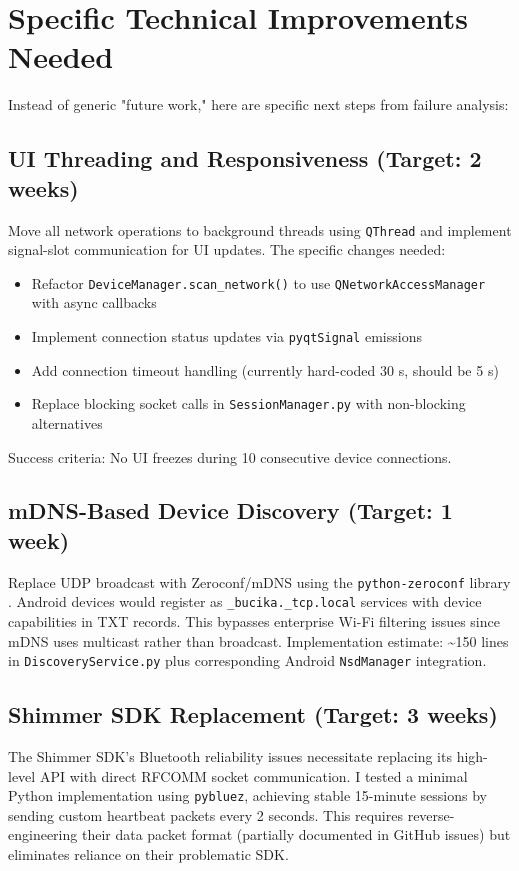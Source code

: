 \section{Specific Technical Improvements Needed}

Instead of generic "future work," here are specific next steps from failure analysis:

\subsection{UI Threading and Responsiveness (Target: 2 weeks)}
Move all network operations to background threads using \texttt{QThread} and implement signal-slot communication for UI updates. The specific changes needed:
\begin{itemize}
    \item Refactor \texttt{DeviceManager.scan\_network()} to use \texttt{QNetworkAccessManager} with async callbacks
    \item Implement connection status updates via \texttt{pyqtSignal} emissions
    \item Add connection timeout handling (currently hard-coded 30 s, should be 5 s)
    \item Replace blocking socket calls in \texttt{SessionManager.py} with non-blocking alternatives
\end{itemize}
Success criteria: No UI freezes during 10 consecutive device connections.

\subsection{mDNS-Based Device Discovery (Target: 1 week)}
Replace UDP broadcast with Zeroconf/mDNS using the \texttt{python-zeroconf} library \cite{ref19}. Android devices would register as \texttt{\_bucika.\_tcp.local} services with device capabilities in TXT records. This bypasses enterprise Wi-Fi filtering issues since mDNS uses multicast rather than broadcast. Implementation estimate: \textasciitilde{}150 lines in \texttt{DiscoveryService.py} plus corresponding Android \texttt{NsdManager} integration.
\subsection{Shimmer SDK Replacement (Target: 3 weeks)}
The Shimmer SDK's Bluetooth reliability issues necessitate replacing its high-level API with direct RFCOMM socket communication. I tested a minimal Python implementation using \texttt{pybluez}, achieving stable 15-minute sessions by sending custom heartbeat packets every 2 seconds. This requires reverse-engineering their data packet format (partially documented in GitHub issues) but eliminates reliance on their problematic SDK.
